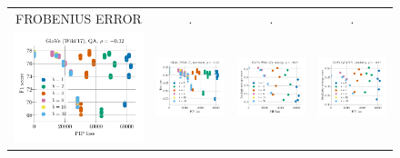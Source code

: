\begin{figure}
\begin{tabular}{@{\hskip -0.0in}c@{\hskip -0.0in}c@{\hskip -0.0in}c@{\hskip -0.0in}c@{\hskip -0.0in}}
		FROBENIUS ERROR & . & . & . \\		
		\includegraphics[width=.245\linewidth]{figures/glove-wiki400k-am_qa_best-f1_vs_gram-large-dim-frob-error_linx.pdf} &
		\includegraphics[width=.245\linewidth]{figures/glove-wiki400k-am_sentiment_trec_test-acc_vs_gram-large-dim-frob-error_linx.pdf} &
		\includegraphics[width=.245\linewidth]{figures/glove-wiki400k-am_intrinsics_analogy-avg-score_vs_gram-large-dim-frob-error_linx.pdf} &
		\includegraphics[width=.245\linewidth]{figures/glove-wiki400k-am_intrinsics_similarity-avg-score_vs_gram-large-dim-frob-error_linx.pdf} \\
		

\end{tabular}
\end{figure}
